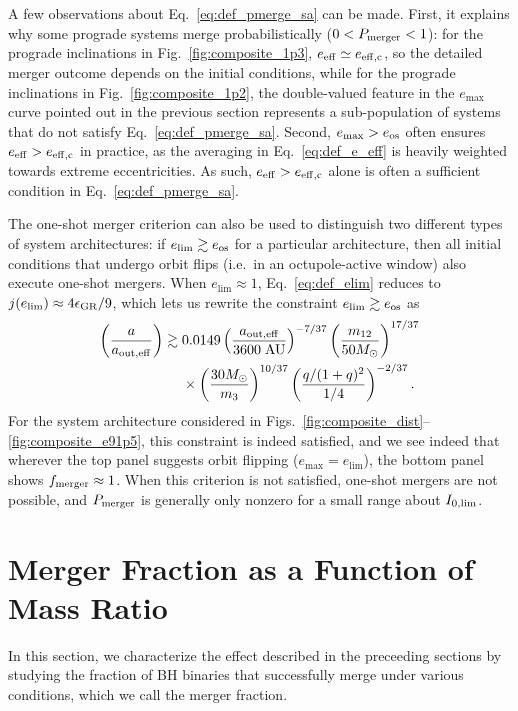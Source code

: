 \documentclass[
        fleqn,
        usenatbib,
    ]{mnras}
\newcommand*{\p}[1]{\left(#1\right)}
\begin{document}
A few observations about Eq.~\eqref{eq:def_pmerge_sa} can be made. First, it
explains why some prograde systems merge probabilistically ($0 < P_{\rm merger}
< 1$): for the prograde inclinations in Fig.~\ref{fig:composite_1p3}, $e_{\rm
eff} \simeq e_{\rm eff, c}$, so the detailed merger outcome depends on the
initial conditions, while for the prograde inclinations in
Fig.~\ref{fig:composite_1p2}, the double-valued feature in the $e_{\max}$ curve
pointed out in the previous section represents a sub-population of systems that
do not satisfy Eq.~\eqref{eq:def_pmerge_sa}. Second, $e_{\max} > e_{\rm os}$
often ensures $e_{\rm eff} > e_{\rm eff, c}$ in practice, as the averaging in
Eq.~\eqref{eq:def_e_eff} is heavily weighted towards extreme eccentricities. As
such, $e_{\rm eff} > e_{\rm eff, c}$ alone is often a sufficient condition in
Eq.~\eqref{eq:def_pmerge_sa}.

The one-shot merger criterion can also be used to distinguish two different
types of system architectures: if $e_{\lim} \gtrsim e_{\rm os}$ for a particular
architecture, then all initial conditions that undergo orbit flips (i.e.\ in an
octupole-active window) also execute one-shot mergers. When $e_{\lim} \approx
1$, Eq.~\eqref{eq:def_elim} reduces to $j(e_{\lim}) \approx 4\epsilon_{\rm GR} /
9$, which lets us rewrite the constraint $e_{\lim} \gtrsim e_{\rm os}$ as
\begin{align}
    \p{\frac{a}{a_{\rm out, eff}}} \gtrsim{}&
        0.0149
        \p{\frac{a_{\rm out, eff}}{3600\;\mathrm{AU}}}^{-7/37}
        \p{\frac{m_{12}}{50M_{\odot}}}^{17/37}\nonumber\\
        &\times\p{\frac{30M_{\odot}}{m_3}}^{10/37}
        \p{\frac{q / (1 + q)^2}{1/4}}^{-2/37}.\label{eq:q_237}
\end{align}
For the system architecture considered in
Figs.~\ref{fig:composite_dist}--\ref{fig:composite_e91p5}, this constraint is
indeed satisfied, and we see indeed that wherever the top panel suggests orbit
flipping ($e_{\max} = e_{\lim}$), the bottom panel shows $f_{\rm merger} \approx
1$. When this criterion is not satisfied, one-shot mergers are not
possible, and $P_{\rm merger}$ is generally only nonzero for a small range about
$I_{\rm 0, \lim}$.

\section{Merger Fraction as a Function of Mass Ratio}\label{s:merger_frac}

In this section, we characterize the effect described in the preceeding sections
by studying the fraction of BH binaries that successfully merge under various
conditions, which we call the merger fraction.
\end{document}
